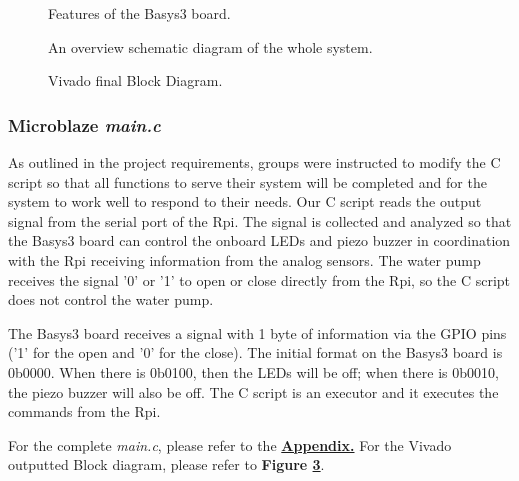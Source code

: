 \documentclass[a4paper]{article}
\begin{document}
\begin{center}
\begin{figure}
  \caption{Features of the Basys3 board.}
  \label{fig:Basys3}
\end{figure}
 
\begin{figure}
  \caption{An overview schematic diagram of the whole system.}
  \label{fig:system}
\end{figure}

\begin{figure}
  \caption{Vivado final Block Diagram.}
  \label{fig:BlockDiagram}
\end{figure}

\end{center}

\subsubsection{Microblaze {\it main.c}}
\label{sec:microblaze}
As outlined in the project requirements, groups were instructed to modify the C script so that all functions to serve their system will be completed and for the system to work well to respond to their needs. Our C script reads the output signal from the serial port of the Rpi. The signal is collected and analyzed so that the Basys3 board can control the onboard LEDs and piezo buzzer in coordination with the Rpi receiving information from the analog sensors. The water pump receives the signal '0' or '1' to open or close directly from the Rpi, so the C script does not control the water pump. 

The Basys3 board receives a signal with 1 byte of information via the GPIO pins ('1' for the open and '0' for the close). The initial format on the Basys3 board is 0b0000. When there is 0b0100, then the LEDs will be off; when there is 0b0010, the piezo buzzer will also be off. The C script is an executor and it executes the commands from the Rpi.

For the complete {\it main.c}, please refer to the \hyperref[sec:enddata]{\textbf{Appendix.}} For the Vivado outputted Block diagram, please refer to \textbf{Figure \ref{fig:BlockDiagram}}.
\end{document}
